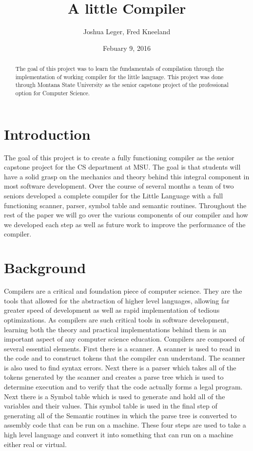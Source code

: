 \documentclass[12pt]{article}
\title{A little Compiler}
\author{Joshua Leger, Fred Kneeland}
\date{Febuary 9, 2016}
\begin{document}
    \maketitle
    \begin{abstract}
	
		The goal of this project was to learn the fundamentals of compilation through the implementation of working compiler for the little language.  This project was done through Montana State University as the senior capstone project of the professional option for Computer Science.  	
	
    \end{abstract}
    \clearpage
    \tableofcontents
    \clearpage
    
    \section{Introduction}
		The goal of this project is to create a fully functioning compiler as the senior capstone project for the CS department at MSU.  The goal is that students will have a solid grasp on the mechanics and theory behind this integral component in most software development.  Over the course of several months a team of two seniors developed a complete compiler for the Little Language with a full functioning scanner, parser, symbol table and semantic routines.  Throughout the rest of the paper we will go over the various components of our compiler and how we developed each step as well as future work to improve the performance of the compiler.
		    
    \section{Background}
    	Compilers are a critical and foundation piece of computer science.  They are the tools that allowed for the abstraction of higher level languages, allowing far greater speed of development as well as rapid implementation of tedious optimizations.  As compilers are such critical tools in software development, learning both the theory and practical implementations behind them is an important aspect of any computer science education.  
    	Compilers are composed of several essential elements.  First there is a scanner.  A scanner is used to read in the code and to construct tokens that the compiler can understand.  The scanner is also used to find syntax errors.  Next there is a parser which takes all of the tokens generated by the scanner and creates a parse tree which is used to determine execution and to verify that the code actually forms a legal program.  Next there is a Symbol table which is used to generate and hold all of the variables and their values.  This symbol table is used in the final step of generating all of the Semantic routines in which the parse tree is converted to assembly code that can be run on a machine.  These four steps are used to take a high level language and convert it into something that can run on a machine either real or virtual. 
    	
\end{document}
